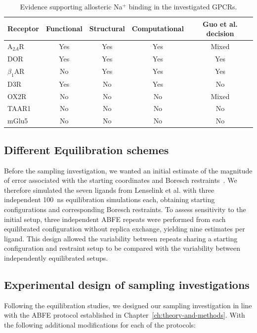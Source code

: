\begin{table}[htbp]
    \centering
    \caption{Evidence supporting allosteric Na$^{+}$ binding in the
    investigated GPCRs.}
    \label{tab:gpcr_sodium_evidence}
    \begin{tabular}{lcccc}
        \toprule
        \textbf{Receptor} & \textbf{Functional} &
        \textbf{Structural} & \textbf{Computational} & \textbf{Guo et al. decision} \\
        \midrule
        A$_{2A}$R       & Yes & Yes & Yes & Mixed \\
        DOR             & Yes & Yes & Yes & Yes \\
        $\beta_1$AR     & No  & Yes & Yes & Yes \\
        D3R             & Yes & No  & Yes & No \\
        OX2R            & No  & No  & No  & Mixed \\
        TAAR1           & No  & No  & No  & No \\
        mGlu5           & No  & No  & No  & No \\
        \bottomrule
    \end{tabular}
\end{table}


\subsection{Different Equilibration schemes}

Before the sampling investigation, we wanted an initial estimate of the magnitude of error associated with the starting coordinates and Boresch restraints~\cite{boresch2024analytical}. We therefore simulated the seven ligands from Lenselink et al. with three independent 100~ns equilibration simulations each, obtaining starting configurations and corresponding Boresch restraints. To assess sensitivity to the initial setup, three independent ABFE repeats were performed from each equilibrated configuration without replica exchange, yielding nine estimates per ligand. This design allowed the variability between repeats sharing a starting configuration and restraint setup to be compared with the variability between independently equilibrated setups.

\subsection{Experimental design of sampling investigations}

Following the equilibration studies, we designed our sampling investigation in line with the ABFE protocol established in Chapter~\ref{ch:theory-and-methods}. With the following additional modifications for each of the protocols:


